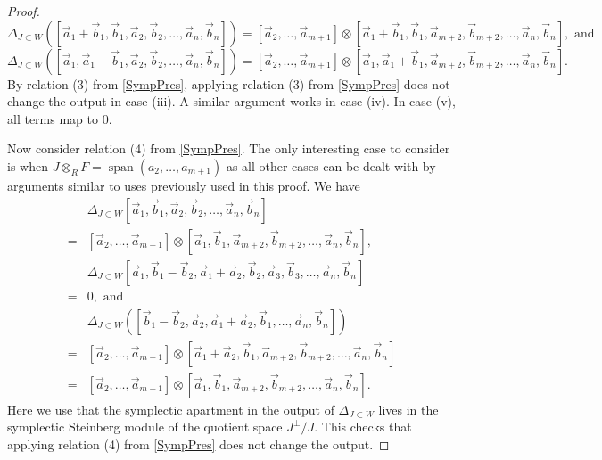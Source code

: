\documentclass[11pt,letterpaper]{amsart}
\DeclareMathOperator{\Span}{span}
\numberwithin{theoremcounter}{section}
\theoremstyle{definition}
\theoremstyle{remark}
\begin{document}
\begin{proof}
$$\Delta_{J \subset W} ([\vec a_1+\vec b_1,\vec b_1, \vec a_2,\vec b_2,\ldots,\vec a_n,\vec b_n  ])=[\vec a_2,\ldots, \vec a_{m+1}] \otimes [\vec a_1+\vec b_1, \vec b_1,\vec a_{m+2}, \vec b_{m+2},\ldots,\vec a_n,\vec b_n  ], \text{ and}$$ 
$$\Delta_{J \subset W} ([\vec a_1,\vec a_1+\vec b_1, \vec a_2, \vec b_2,\ldots,\vec a_n,\vec b_n  ])=[\vec a_2,\ldots, \vec a_{m+1}] \otimes [\vec a_1, \vec a_1+\vec b_1,\vec a_{m+2}, \vec b_{m+2},\ldots,\vec a_n,\vec b_n  ].$$ By relation (3) from \autoref{SympPres}, applying relation (3) from \autoref{SympPres} does not change the output in case (iii). A similar argument works in case (iv).
In case (v), all terms map to $0$. 

Now consider relation (4) from \autoref{SympPres}. The only interesting case to consider is when $J \otimes_R F=\Span(a_2,\ldots,a_{m+1})$ as all other cases can be dealt with by arguments similar to uses previously used in this proof.  We have 
\begin{align*}
    &\Delta_{J \subset W} [\vec a_1,\vec b_1, \vec a_2, \vec b_2,\ldots,\vec a_n,\vec b_n  ]\\
    =&[\vec a_2,\ldots,\vec a_{m+1}] \otimes [\vec a_1,\vec b_1,\vec a_{m+2}, \vec b_{m+2},\ldots,\vec a_n,\vec b_n],\\ 
    &\Delta_{J \subset W} [\vec a_1,\vec b_1-\vec b_2, \vec a_1 + \vec a_2, \vec b_2,\vec a_3,\vec b_3,\ldots,\vec a_n,\vec b_n  ]\\
    =&0, \text{ and}\\
    &\Delta_{J \subset W}([\vec b_1-\vec b_2,\vec a_2, \vec a_1+\vec a_2, \vec b_1,\ldots,\vec a_n,\vec b_n  ])\\
    = &[\vec a_2,\ldots,\vec a_{m+1}] \otimes [\vec a_1+\vec a_2,\vec b_1,\vec a_{m+2}, \vec b_{m+2},\ldots,\vec a_n,\vec b_n]\\
    =&[\vec a_2,\ldots,\vec a_{m+1}] \otimes [\vec a_1,\vec b_1,\vec a_{m+2}, \vec b_{m+2},\ldots,\vec a_n,\vec b_n].
\end{align*}
Here we use that the symplectic apartment in the output of $\Delta_{J \subset W}$ lives in the symplectic Steinberg module of the quotient space $J^\perp/J$. This checks that applying relation (4) from \autoref{SympPres} does not change the output.
\end{proof}
\end{document}
